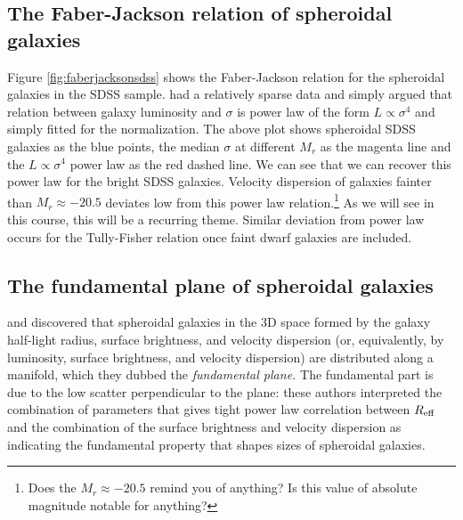 \subsection{The Faber-Jackson relation of spheroidal galaxies}

Figure \ref{fig:faberjacksonsdss} shows the Faber-Jackson relation for the spheroidal galaxies in the SDSS sample. 
\href{http://adsabs.harvard.edu/abs/1976ApJ...204..668F}{\citet{faber_jackson76}} had a relatively sparse data and simply argued that relation between galaxy luminosity and $\sigma$ is power law of the form $L\propto \sigma^4$ and simply fitted for the normalization. The above plot shows spheroidal SDSS galaxies as the blue points, the median $\sigma$ at different $M_r$ as the magenta line and the $L\propto \sigma^4$ power law as the red dashed line. We can see that we can recover this power law for the bright SDSS galaxies. Velocity dispersion of galaxies fainter than $M_r\approx -20.5$ deviates low from this power law relation.\footnote{Does the $M_r\approx -20.5$ remind you of anything? Is this value of absolute magnitude notable for anything?} As we will see in this course, this will be a recurring theme. Similar deviation from power law occurs for the Tully-Fisher relation once faint dwarf galaxies are included. 


\subsection{The fundamental plane of spheroidal galaxies}

\href{http://adsabs.harvard.edu/abs/1987ApJ...313...42D}{\citet{dressler_etal87}} and \href{http://adsabs.harvard.edu/abs/1987ApJ...313...59D}{\citet{djorgovski_davis87}} discovered that spheroidal galaxies in the 3D space formed by the galaxy half-light radius, surface brightness, and velocity dispersion (or, equivalently, by luminosity, surface brightness, and velocity dispersion) are distributed along a manifold, which they dubbed the {\it fundamental plane.} The fundamental part is due to the low scatter perpendicular to the plane: these authors interpreted the combination of parameters that gives tight power law correlation between $R_{\rm eff}$ and the combination of the surface brightness and velocity dispersion as indicating the fundamental property that shapes sizes of spheroidal galaxies. 

